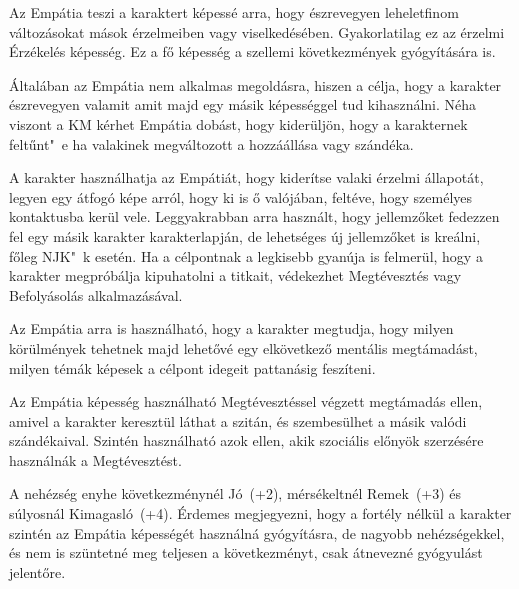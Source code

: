 
Az Empátia teszi a karaktert képessé arra, hogy észrevegyen leheletfinom változásokat mások érzelmeiben vagy viselkedésében. Gyakorlatilag ez az érzelmi Érzékelés képesség.
Ez a fő képesség a szellemi következmények gyógyítására is.

\overcome Általában az Empátia nem alkalmas megoldásra, hiszen a célja, hogy a karakter észrevegyen valamit amit majd egy másik képességgel tud kihasználni. Néha viszont a KM kérhet Empátia dobást, hogy kiderüljön, hogy a karakternek feltűnt"~e ha valakinek megváltozott a hozzáállása vagy szándéka.

\advantage A karakter használhatja az Empátiát, hogy kiderítse valaki érzelmi állapotát, legyen egy átfogó képe arról, hogy ki is ő valójában, feltéve, hogy személyes kontaktusba kerül vele. Leggyakrabban arra használt, hogy jellemzőket fedezzen fel egy másik karakter karakterlapján, de lehetséges új jellemzőket is kreálni, főleg NJK"~k esetén. Ha a célpontnak a legkisebb gyanúja is felmerül, hogy a karakter megpróbálja kipuhatolni a titkait, védekezhet Megtévesztés vagy Befolyásolás alkalmazásával.

Az Empátia arra is használható, hogy a karakter megtudja, hogy milyen körülmények tehetnek majd lehetővé egy elkövetkező mentális megtámadást, milyen témák képesek a célpont idegeit pattanásig feszíteni.

\noattackatall

 Az Empátia képesség használható Megtévesztéssel végzett megtámadás ellen, amivel a karakter keresztül láthat a szitán, és szembesülhet a másik valódi szándékaival. Szintén használható azok ellen, akik szociális előnyök szerzésére használnák a Megtévesztést.




A nehézség enyhe következménynél Jó~(+2), mérsékeltnél Remek~(+3) és súlyosnál Kimagasló~(+4). Érdemes megjegyezni, hogy a fortély nélkül a karakter szintén az Empátia képességét használná gyógyításra, de nagyobb nehézségekkel, és nem is szüntetné meg teljesen a következményt, csak átnevezné gyógyulást jelentőre.
